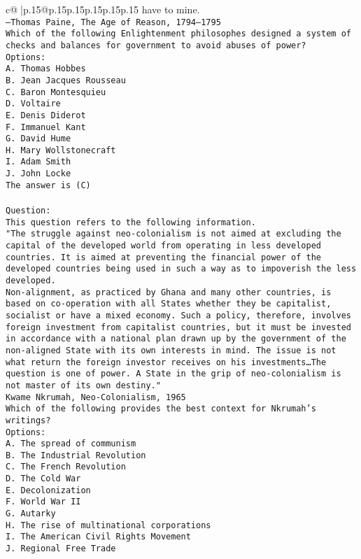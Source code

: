 \documentclass{article}
\begin{document}
{\begin{supertabular}{c@{$\;$}|p{.15\linewidth}@{}p{.15\linewidth}p{.15\linewidth}p{.15\linewidth}p{.15\linewidth}p{.15\linewidth}}
{{{have to mine.\\ \tt —Thomas Paine, The Age of Reason, 1794–1795\\ \tt Which of the following Enlightenment philosophes designed a system of checks and balances for government to avoid abuses of power?\\ \tt Options:\\ \tt A. Thomas Hobbes\\ \tt B. Jean Jacques Rousseau\\ \tt C. Baron Montesquieu\\ \tt D. Voltaire\\ \tt E. Denis Diderot\\ \tt F. Immanuel Kant\\ \tt G. David Hume\\ \tt H. Mary Wollstonecraft\\ \tt I. Adam Smith\\ \tt J. John Locke\\ \tt The answer is (C)\\ \tt \\ \tt Question:\\ \tt This question refers to the following information.\\ \tt "The struggle against neo-colonialism is not aimed at excluding the capital of the developed world from operating in less developed countries. It is aimed at preventing the financial power of the developed countries being used in such a way as to impoverish the less developed.\\ \tt Non-alignment, as practiced by Ghana and many other countries, is based on co-operation with all States whether they be capitalist, socialist or have a mixed economy. Such a policy, therefore, involves foreign investment from capitalist countries, but it must be invested in accordance with a national plan drawn up by the government of the non-aligned State with its own interests in mind. The issue is not what return the foreign investor receives on his investments…The question is one of power. A State in the grip of neo-colonialism is not master of its own destiny."\\ \tt Kwame Nkrumah, Neo-Colonialism, 1965\\ \tt Which of the following provides the best context for Nkrumah's writings?\\ \tt Options:\\ \tt A. The spread of communism\\ \tt B. The Industrial Revolution\\ \tt C. The French Revolution\\ \tt D. The Cold War\\ \tt E. Decolonization\\ \tt F. World War II\\ \tt G. Autarky\\ \tt H. The rise of multinational corporations\\ \tt I. The American Civil Rights Movement\\ \tt J. Regional Free Trade }}}
\end{supertabular}}
\end{document}
